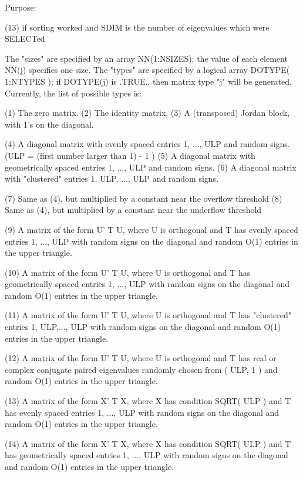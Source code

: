 \begin{DoxyParagraph}{Purpose\+: }
\begin{DoxyVerb}
    (13)    if sorting worked and SDIM is the number of
            eigenvalues which were SELECTed

    The "sizes" are specified by an array NN(1:NSIZES); the value of
    each element NN(j) specifies one size.
    The "types" are specified by a logical array DOTYPE( 1:NTYPES );
    if DOTYPE(j) is .TRUE., then matrix type "j" will be generated.
    Currently, the list of possible types is:

    (1)  The zero matrix.
    (2)  The identity matrix.
    (3)  A (transposed) Jordan block, with 1's on the diagonal.

    (4)  A diagonal matrix with evenly spaced entries
         1, ..., ULP  and random signs.
         (ULP = (first number larger than 1) - 1 )
    (5)  A diagonal matrix with geometrically spaced entries
         1, ..., ULP  and random signs.
    (6)  A diagonal matrix with "clustered" entries 1, ULP, ..., ULP
         and random signs.

    (7)  Same as (4), but multiplied by a constant near
         the overflow threshold
    (8)  Same as (4), but multiplied by a constant near
         the underflow threshold

    (9)  A matrix of the form  U' T U, where U is orthogonal and
         T has evenly spaced entries 1, ..., ULP with random signs
         on the diagonal and random O(1) entries in the upper
         triangle.

    (10) A matrix of the form  U' T U, where U is orthogonal and
         T has geometrically spaced entries 1, ..., ULP with random
         signs on the diagonal and random O(1) entries in the upper
         triangle.

    (11) A matrix of the form  U' T U, where U is orthogonal and
         T has "clustered" entries 1, ULP,..., ULP with random
         signs on the diagonal and random O(1) entries in the upper
         triangle.

    (12) A matrix of the form  U' T U, where U is orthogonal and
         T has real or complex conjugate paired eigenvalues randomly
         chosen from ( ULP, 1 ) and random O(1) entries in the upper
         triangle.

    (13) A matrix of the form  X' T X, where X has condition
         SQRT( ULP ) and T has evenly spaced entries 1, ..., ULP
         with random signs on the diagonal and random O(1) entries
         in the upper triangle.

    (14) A matrix of the form  X' T X, where X has condition
         SQRT( ULP ) and T has geometrically spaced entries
         1, ..., ULP with random signs on the diagonal and random
         O(1) entries in the upper triangle.


\end{DoxyVerb}
\end{DoxyParagraph}
